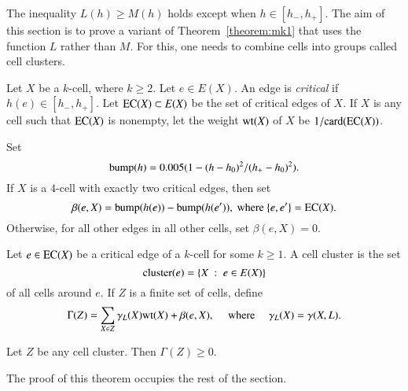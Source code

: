 The inequality $L(h)\ge M(h)$ holds except when $h\in [h_-,h_+]$.  The aim of this section is to prove a variant of Theorem~\ref{theorem:mk1} that uses the function $L$ rather than $M$.  For this, one needs to combine cells into groups called cell clusters.

\begin{definition}
Let $X$ be a $k$-cell, where $k\ge 2$.  Let $e\in E(X)$.
An edge is {\it critical} if $h(e)\in[h_-,h_+]$.
Let ${\operatorname{EC}}(X)\subset E(X)$ be the set of critical edges of $X$.  If $X$ is any cell such that ${\operatorname{EC}}(X)$ is nonempty, let the weight ${\operatorname{wt}}(X)$ of $X$  
be $1/{\operatorname{card}}({\operatorname{EC}}(X))$.
\end{definition}
%
%
%

\begin{definition}  Set 
$$
{\operatorname{bump}}(h) = 0.005 (1 - (h-h_0)^2/(h_+-h_0)^2).
$$
If $X$ is a $4$-cell with exactly two critical edges, then set
$$
\beta(e,X) = {\operatorname{bump}}(h(e)) - {\operatorname{bump}}(h(e')), \text{ where } \{e,e'\} = {\operatorname{EC}}(X).  
$$
Otherwise, for all other edges in all other cells, set $\beta(e,X) = 0$.
\end{definition}
%
%

\begin{definition}
Let $e\in {\operatorname{EC}}(X)$ be a critical edge of a $k$-cell for some $k\ge 1$.
A cell cluster is the set 
$$
{\operatorname{cluster}}(e) = \{X\ :\  e\in E(X)\} 
$$
%
of all cells around $e$. 
If $Z$ is a finite set of cells, define
%
$$
\Gamma(Z) = \sum_{X\in Z} \gamma_L(X) {\operatorname{wt}}(X) +\beta(e,X),\quad\hbox{ where }\quad
\gamma_L(X) = \gamma(X,L).
$$
%
%

\end{definition}
%

\begin{theorem}\label{lemma:cluster} 
Let $Z$ be any cell cluster.  Then $\Gamma(Z)\ge 0$.
\end{theorem}

The proof of this theorem occupies the rest of the section.  


